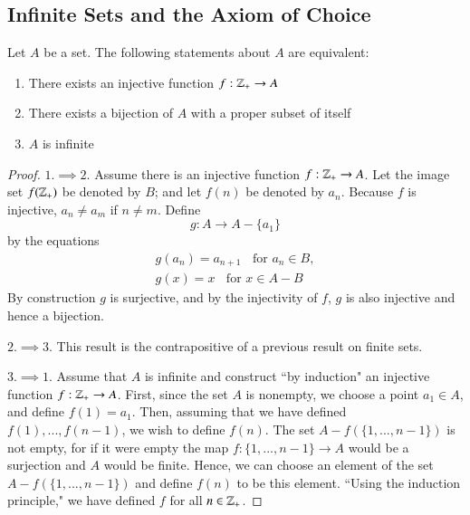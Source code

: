 \documentclass[12pt, a4paper, oneside, openright, titlepage]{book}
\begin{document}
\begin{appendices}
    \section{Infinite Sets and the Axiom of Choice}


    \begin{theorem}\label{thm:infequivs}
        Let $A$ be a set. The following statements about $A$ are equivalent:\begin{enumerate}
            \item There exists an injective function $f:\mathbb Z_+\rightarrow A$
            \item There exists a bijection of $A$ with a proper subset of itself
            \item $A$ is infinite
        \end{enumerate}
    \end{theorem}
    \begin{proof}
        $1.\implies 2.$ Assume there is an injective function $f:\mathbb Z_+\rightarrow A$. Let the image set $f(\mathbb Z_+)$ be denoted by $B$; and let $f(n)$ be denoted by $a_n$. Because $f$ is injective, $a_n\neq a_m$ if $n \neq m$. Define \begin{equation*}
            g:A\rightarrow A-\{a_1\}
        \end{equation*}
        by the equations \begin{align*}
            g(a_n) = a_{n+1}\;\;\text{ for }a_n \in B, \\
            g(x) = x\;\;\text{ for } x \in A-B
        \end{align*}
        By construction $g$ is surjective, and by the injectivity of $f$, $g$ is also injective and hence a bijection.

        $2.\implies 3.$ This result is the contrapositive of a previous result on finite sets.


        $3.\implies 1.$ Assume that $A$ is infinite and construct ``by induction" an injective function $f:\mathbb Z_+\rightarrow A$. First, since the set $A$ is nonempty, we choose a point $a_1 \in A$, and define $f(1) = a_1$. Then, assuming that we have defined $f(1),...,f(n-1)$, we wish to define $f(n)$. The set $A-f(\{1,...,n-1\})$ is not empty, for if it were empty the map $f:\{1,...,n-1\}\rightarrow A$ would be a surjection and $A$ would be finite. Hence, we can choose an element of the set $A-f(\{1,...,n-1\})$ and define $f(n)$ to be this element. ``Using the induction principle," we have defined $f$ for all $n \in \mathbb Z_+$.


\end{proof}
\end{appendices}
\end{document}

